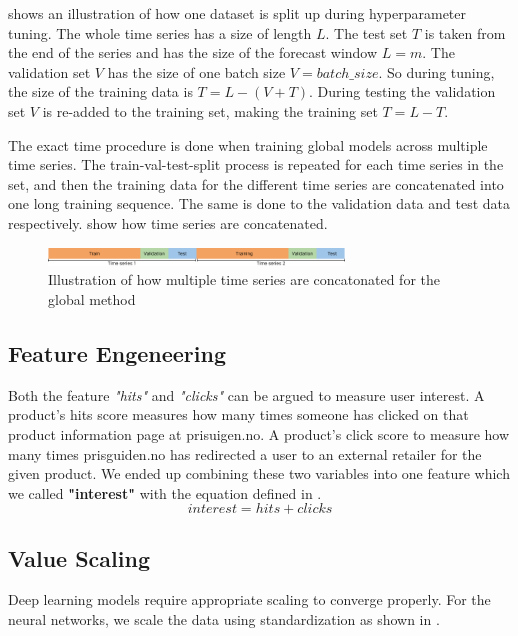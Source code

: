  shows an illustration of how one dataset is split up during
hyperparameter tuning.
The whole time series has a size of length $L$. The test set $T$ is taken from the end of the series
and has the size of the forecast window $L = m$. The validation set $V$ has the size of
one batch size $V=batch\_size$. So during tuning, the size of the training data is
$T = L - (V + T)$. During testing the validation set $V$ is re-added to the training set,
making the training set $T = L - T$.

The exact time procedure is done when training global models across multiple time series.
The train-val-test-split process is repeated for each time series in the set, and then the
training data for the different time series are concatenated into one long training sequence.
The same is done to the validation data and test data respectively.
 show how time series are concatenated.

\begin{figure}[h!]
  \centering
  \includegraphics[width=0.7\textwidth]{./figs/illustrations/illustration_global_time_series.png}
  \hfill
  \caption{Illustration of how multiple time series are concatonated for the global method}
  \label{fig:global-time-series}
\end{figure}



\subsection{Feature Engeneering}
Both the feature \textit{"hits"} and \textit{"clicks"} can be argued to measure
user interest. A product's hits score measures how many times someone has clicked
on that product information page at prisuigen.no. A product's click score to measure
how many times prisguiden.no has redirected a user to an external retailer for the given product.
We ended up combining these two variables into one feature which we called \textbf{"interest"}
with the equation defined in .
\begin{equation}
  interest = hits + clicks
  \label{eq:interest}
\end{equation}




\subsection{Value Scaling}
\label{section:Data:Preprocessing:value-scaling}
Deep learning models require appropriate scaling to converge properly.
For the neural networks, we scale the data using standardization
as shown in .

